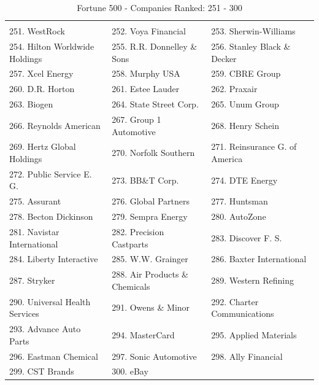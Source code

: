 \documentclass{article}
\begin{document}
\begin{table}[H]
\centering
\caption{Fortune 500 - Companies Ranked: 251 - 300}
\begin{tabular}{lll}
\hline
\\ 251. WestRock 
&  252. Voya Financial 
&  253. Sherwin-Williams 
\\ 254. Hilton Worldwide Holdings 
&  255. R.R. Donnelley \& Sons 
&  256. Stanley Black \& Decker 
\\ 257. Xcel Energy 
&  258. Murphy USA 
&  259. CBRE Group 
\\ 260. D.R. Horton 
&  261. Estee Lauder 
&  262. Praxair 
\\ 263. Biogen 
&  264. State Street Corp. 
&  265. Unum Group 
\\ 266. Reynolds American 
&  267. Group 1 Automotive 
&  268. Henry Schein 
\\ 269. Hertz Global Holdings 
&  270. Norfolk Southern 
&  271. Reinsurance G. of America 
\\ 272. Public Service E. G. 
&  273. BB\&T Corp. 
&  274. DTE Energy 
\\ 275. Assurant 
&  276. Global Partners 
&  277. Huntsman 
\\ 278. Becton Dickinson 
&  279. Sempra Energy 
&  280. AutoZone 
\\ 281. Navistar International 
&  282. Precision Castparts 
&  283. Discover F. S. 
\\ 284. Liberty Interactive 
&  285. W.W. Grainger 
&  286. Baxter International 
\\ 287. Stryker 
&  288. Air Products \& Chemicals 
&  289. Western Refining 
\\ 290. Universal Health Services 
&  291. Owens \& Minor 
&  292. Charter Communications 
\\ 293. Advance Auto Parts 
&  294. MasterCard 
&  295. Applied Materials 
\\ 296. Eastman Chemical 
&  297. Sonic Automotive 
&  298. Ally Financial 
\\ 299. CST Brands 
&  300. eBay 
&   
 \\ \hline

\end{tabular}
\end{table}
\end{document}
